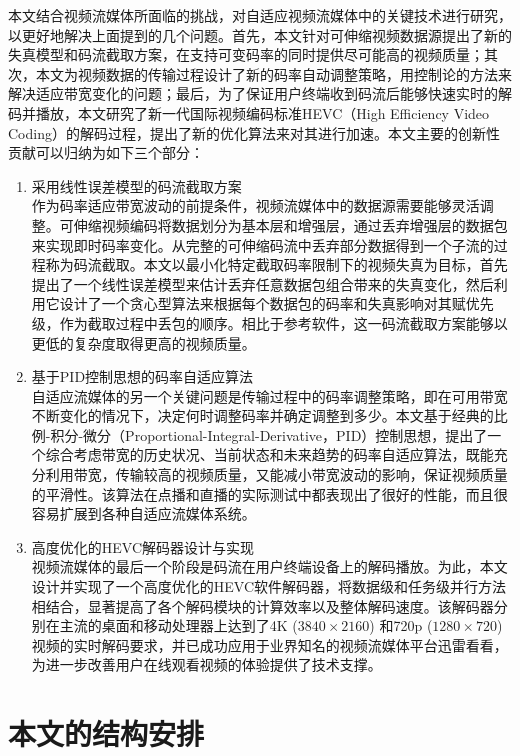 本文结合视频流媒体所面临的挑战，对自适应视频流媒体中的关键技术进行研究，以更好地解决上面提到的几个问题。首先，本文针对可伸缩视频数据源提出了新的失真模型和码流截取方案，在支持可变码率的同时提供尽可能高的视频质量；其次，本文为视频数据的传输过程设计了新的码率自动调整策略，用控制论的方法来解决适应带宽变化的问题；最后，为了保证用户终端收到码流后能够快速实时的解码并播放，本文研究了新一代国际视频编码标准HEVC（High Efficiency Video Coding）\supercite{HEVC-Overview}的解码过程，提出了新的优化算法来对其进行加速。本文主要的创新性贡献可以归纳为如下三个部分：
\begin{enumerate}
\item {采用线性误差模型的码流截取方案}\\
作为码率适应带宽波动的前提条件，视频流媒体中的数据源需要能够灵活调整。可伸缩视频编码将数据划分为基本层和增强层，通过丢弃增强层的数据包来实现即时码率变化。从完整的可伸缩码流中丢弃部分数据得到一个子流的过程称为码流截取。本文以最小化特定截取码率限制下的视频失真为目标，首先提出了一个线性误差模型来估计丢弃任意数据包组合带来的失真变化，然后利用它设计了一个贪心型算法来根据每个数据包的码率和失真影响对其赋优先级，作为截取过程中丢包的顺序。相比于参考软件，这一码流截取方案能够以更低的复杂度取得更高的视频质量。
\item {基于PID控制思想的码率自适应算法}\\
自适应流媒体的另一个关键问题是传输过程中的码率调整策略，即在可用带宽不断变化的情况下，决定何时调整码率并确定调整到多少。本文基于经典的比例-积分-微分（Proportional-Integral-Derivative，PID）控制思想，提出了一个综合考虑带宽的历史状况、当前状态和未来趋势的码率自适应算法，既能充分利用带宽，传输较高的视频质量，又能减小带宽波动的影响，保证视频质量的平滑性。该算法在点播和直播的实际测试中都表现出了很好的性能，而且很容易扩展到各种自适应流媒体系统。
\item {高度优化的HEVC解码器设计与实现}\\
视频流媒体的最后一个阶段是码流在用户终端设备上的解码播放。为此，本文设计并实现了一个高度优化的HEVC软件解码器，将数据级和任务级并行方法相结合，显著提高了各个解码模块的计算效率以及整体解码速度。该解码器分别在主流的桌面和移动处理器上达到了4K ($3840 \times 2160$) 和720p ($1280 \times 720$) 视频的实时解码要求，并已成功应用于业界知名的视频流媒体平台迅雷看看，为进一步改善用户在线观看视频的体验提供了技术支撑。
\end{enumerate}

\section{本文的结构安排}

